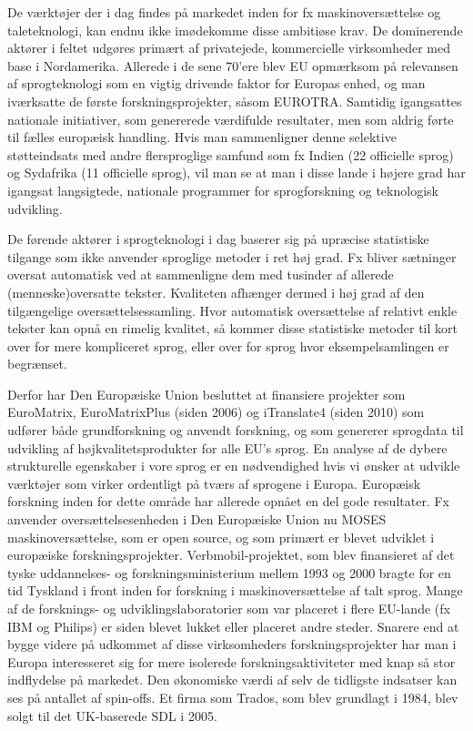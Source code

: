 \begin{multicols}{2}
 De v\ae rkt\o jer der i dag findes \mbox{p\aa} markedet inden for fx maskinovers\ae ttelse og taleteknologi, kan endnu ikke im\o dekomme disse ambiti\o se krav. De dominerende akt\o rer i feltet udg\o res prim\ae rt af privatejede, kommercielle virksomheder med base i Nordamerika. Allerede i de sene 70'ere blev EU opm\ae rksom \mbox{p\aa} relevansen af sprogteknologi som en vigtig drivende faktor for Europas enhed, og man iv\ae rksatte de f\o rste forskningsprojekter, \mbox{s\aa}som EUROTRA. Samtidig igangsattes nationale initiativer, som genererede v\ae rdifulde resultater, men som aldrig f\o rte til f\ae lles europ\ae isk handling. 
Hvis man sammenligner denne selektive st\o tteindsats med andre flersproglige samfund som fx Indien (22 officielle sprog) og Sydafrika (11 officielle sprog), vil man se at man i disse lande i h\o jere grad har igangsat langsigtede, nationale programmer for sprogforskning og teknologisk udvikling.

De f\o rende akt\o rer i sprogteknologi i dag baserer sig \mbox{p\aa} upr\ae cise statistiske tilgange som ikke anvender sproglige metoder i ret h\o j grad. Fx bliver s\ae tninger oversat automatisk ved at sammenligne dem med tusinder af allerede (menneske)oversatte tekster. Kvaliteten afh\ae nger dermed i h\o j grad af den tilg\ae ngelige overs\ae ttelsessamling. Hvor automatisk overs\ae ttelse af relativt enkle tekster kan \mbox{opn\aa} en rimelig kvalitet, \mbox{s\aa} kommer disse statistiske metoder til kort over for mere kompliceret sprog, eller over for sprog hvor eksempelsamlingen er begr\ae nset.


Derfor har Den Europ\ae iske Union besluttet at finansiere projekter som EuroMatrix, EuroMatrixPlus (siden 2006) og iTranslate4 (siden 2010) som udf\o rer b\aa de grundforskning og anvendt forskning, og som genererer sprogdata til udvikling af h\o jkvalitetsprodukter for alle EU's sprog. En analyse af de dybere strukturelle egenskaber i vore sprog er en n\o dvendighed hvis vi \o nsker at udvikle v\ae rkt\o jer som virker ordentligt \mbox{p\aa} tv\ae rs af sprogene i Europa.
Europ\ae isk forskning inden for dette omr\aa de har allerede opn\aa et en del gode resultater. Fx anvender overs\ae ttelsesenheden i Den Europ\ae iske Union nu MOSES maskinovers\ae ttelse, som er open source, og som prim\ae rt er blevet udviklet i europ\ae iske forskningsprojekter. Verbmobil-projektet, som blev finansieret af det tyske uddannelses- og forskningsministerium mellem 1993 og 2000 bragte for en tid Tyskland i front inden for forskning i maskinovers\ae ttelse af talt sprog. Mange af de forsknings- og udviklingslaboratorier som var placeret i flere EU-lande (fx IBM og Philips) er siden blevet lukket eller placeret andre steder. Snarere end at bygge videre \mbox{p\aa} udkommet af disse virksomheders forskningsprojekter har man i Europa interesseret sig for mere isolerede forskningsaktiviteter med knap \mbox{s\aa} stor indflydelse \mbox{p\aa} markedet. Den \o konomiske v\ae rdi af selv de tidligste indsatser kan ses \mbox{p\aa} antallet af spin-offs. Et firma som Trados, som blev grundlagt i 1984, blev solgt til det UK-baserede SDL i 2005.


\end{multicols}
